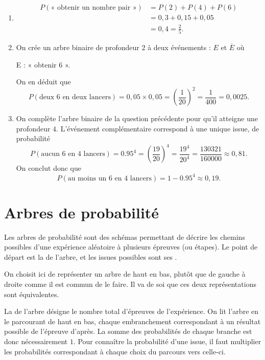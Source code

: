 {	\begin{enumerate}
		\item 
			\begin{align*}
				P(\text{« obtenir un nombre pair »}) &= P(2) + P(4) + P(6) \\
				&= 0,3 + 0,15 + 0,05 \\
				&= 0,4 = \frac25.
			\end{align*}
		\item
			On crée un arbre binaire de profondeur $2$ à deux événements : $E$ et $\overline{E}$ où
				\begin{center}
					E : « obtenir $6$ ».
				\end{center}
			On en déduit que
			\[ P(\text{deux $6$ en deux lancers}) = 0,05 \times 0,05 = \left(\frac1{20}\right)^2 = \frac1{400} = 0,0025. \]
		\item
			On complète l'arbre binaire de la question précédente pour qu'il atteigne une profondeur $4$.
			L'événement complémentaire correspond à une unique issue, de probabilité
				\[ P(\text{aucun $6$ en $4$ lancers}) = 0.95^4 = \left(\frac{19}{20}\right)^4 = \frac{19^4}{20^4} = \frac{130321}{160000} \approx 0,81. \]
			On conclut donc que
				\[ P(\text{au moins un $6$ en $4$ lancers}) = 1-0.95^4 \approx 0,19. \]
				
	\end{enumerate}
}

\section{Arbres de probabilité}

Les arbres de probabilité sont des schémas permettant de décrire les chemins possibles d'une expérience aléatoire à plusieurs épreuves (ou étapes).
Le point de départ est la  de l'arbre, et les issues possibles sont ses .

On choisit ici de représenter un arbre de haut en bas, plutôt que de gauche à droite comme il est commun de le faire.
Il va de soi que ces deux représentations sont équivalentes.

La  de l'arbre désigne le nombre total d'épreuves de l'expérience.
On lit l'arbre en le parcourant de haut en bas, chaque embranchement correspondant à un résultat possible de l'épreuve d'après.
La somme des probabilités de chaque branche est donc nécessairement $1$.
Pour connaître la probabilité d'une issue, il faut multiplier les probabilités correspondant à chaque choix du parcours vers celle-ci.

